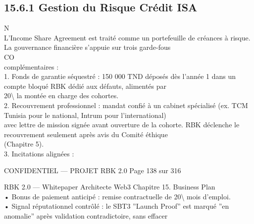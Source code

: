 \subsection{15.6.1 Gestion du Risque Crédit ISA}
\vspace{0.5em}
N\\
L’Income Share Agreement est traité comme un portefeuille de créances à risque. La gouvernance financière s’appuie sur trois garde-fous\\
CO\\
complémentaires :\\
\vspace{0.5em}
1. Fonds de garantie séquestré : 150 000 TND déposés dès l’année 1 dans un compte bloqué RBK dédié aux défauts, alimentés par\\
20\textbackslash{}%
la montée en charge des cohortes.\\
\vspace{0.5em}
2. Recouvrement professionnel : mandat confié à un cabinet spécialisé (ex. TCM Tunisia pour le national, Intrum pour l’international)\\
avec lettre de mission signée avant ouverture de la cohorte. RBK déclenche le recouvrement seulement après avis du Comité éthique\\
(Chapitre 5).\\
\vspace{0.5em}
3. Incitations alignées :\\
\vspace{0.5em}
\vspace{0.5em}
\begin{confidential}CONFIDENTIEL — PROJET RBK 2.0                                   Page 138 sur 316\end{confidential}
RBK 2.0 — Whitepaper Architecte Web3                                                                                               Chapitre 15. Business Plan\\
\vspace{0.5em}
\vspace{0.5em}
• Bonus de paiement anticipé : remise contractuelle de 20\textbackslash{}%
mois d’emploi.\\
• Signal réputationnel contrôlé : le SBT3 ”Launch Proof” est marqué ”en anomalie” après validation contradictoire, sans effacer\\
